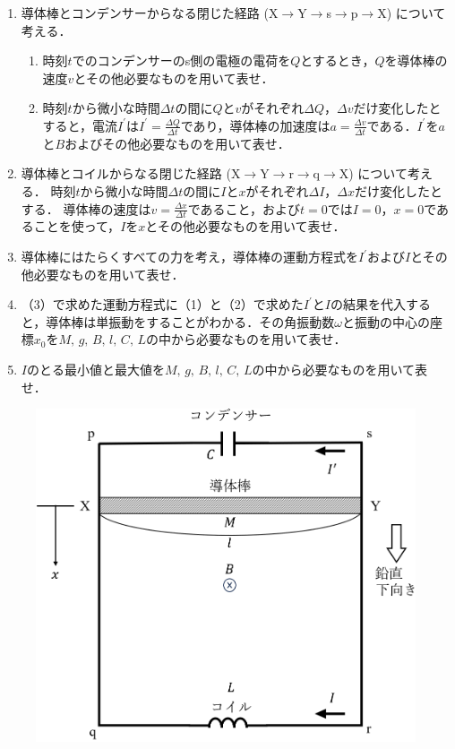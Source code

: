 \begin{enumerate}[（1）]
  \setlength{\leftskip}{-1.5zw}
  \setlength{\itemindent}{1zw}\setlength{\labelsep}{0.5zw}
  \setlength{\labelwidth}{1zw}\setlength{\leftmargin}{1zw}
  \setlength{\itemsep}{0.5\baselineskip}
  \item 導体棒とコンデンサーからなる閉じた経路
  (X$\rightarrow$Y$\rightarrow$s$\rightarrow$p$\rightarrow$X)
  について考える．
  \begin{enumerate}[（a）]
    \setlength{\leftskip}{-3zw}
    \setlength{\itemindent}{1zw}\setlength{\labelsep}{0.5zw}
    \setlength{\labelwidth}{1zw}\setlength{\leftmargin}{1zw}
    \item 時刻$t$でのコンデンサーのs側の電極の電荷を$Q$とするとき，$Q$を導体棒の速度$v$とその他必要なものを用いて表せ．
    \item 時刻$t$から微小な時間$\varDelta t$の間に$Q$と$v$がそれぞれ$\varDelta Q$，$\varDelta v$だけ変化したとすると，電流$I^\prime$は$I^\prime =\tfrac{\Delta Q}{\Delta t}$であり，導体棒の加速度は$a=\tfrac{\Delta v}{\Delta t}$である．$I^\prime$を$a$と$B$およびその他必要なものを用いて表せ．
  \end{enumerate}
  \item 導体棒とコイルからなる閉じた経路
  (X$\rightarrow$Y$\rightarrow$r$\rightarrow$q$\rightarrow$X)
  について考える．
  時刻$t$から微小な時間$\Delta t$の間に$I$と$x$がそれぞれ$\Delta I$，$\Delta x$だけ変化したとする．
  導体棒の速度は$v=\tfrac{\Delta x}{\Delta t}$であること，および$t=0$では$I=0$，$x=0$であることを使って，$I$を$x$とその他必要なものを用いて表せ．
  \item 導体棒にはたらくすべての力を考え，導体棒の運動方程式を$I^\prime$および$I$とその他必要なものを用いて表せ．
  \item （3）で求めた運動方程式に（1）と（2）で求めた$I^\prime$と$I$の結果を代入すると，導体棒は単振動をすることがわかる．その角振動数$\omega$と振動の中心の座標$x_0$を$M,\,g,\,B,\,l,\,C,\,L$の中から必要なものを用いて表せ．
  \item $I$のとる最小値と最大値を$M,\,g,\,B,\,l,\,C,\,L$の中から必要なものを用いて表せ．
\end{enumerate}

\begin{figure}[H]
  \centering
  \includegraphics[width=.5\columnwidth]{../graphs/jumon_134.png}
  \caption{}
  \label{fig:j134}
\end{figure}

